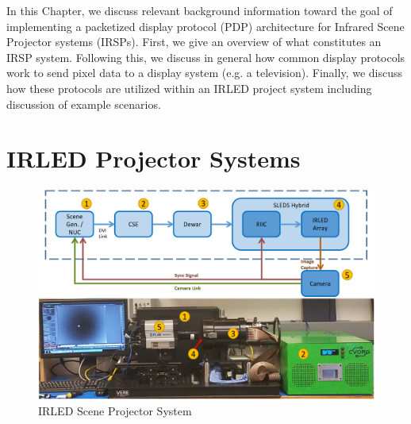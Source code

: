\label{chap:background}

In this Chapter, we discuss relevant background information toward the goal of implementing a packetized display protocol (PDP) architecture for Infrared Scene Projector systems (IRSPs). First, we give an overview of what constitutes an IRSP system. Following this, we discuss in general how common display protocols work to send pixel data to a display system (e.g. a television). Finally, we discuss how these protocols are utilized within an IRLED project system including discussion of example scenarios.

\section{IRLED Projector Systems}

\begin{figure}
    \centering
    \includegraphics[width=1.0\textwidth]{fig/sleds_system.png}
    \caption{IRLED Scene Projector System}
    \label{fig:sleds_system}
\end{figure}

